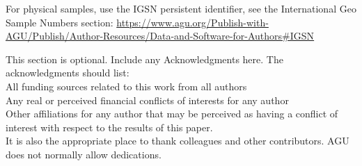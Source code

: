 \documentclass[draft]{agujournal2019}
\begin{document}
For physical samples, use the IGSN persistent identifier, see the International Geo Sample Numbers section:
\url{https://www.agu.org/Publish-with-AGU/Publish/Author-Resources/Data-and-Software-for-Authors#IGSN}

\acknowledgments
This section is optional. Include any Acknowledgments here.
The acknowledgments should list:\\
All funding sources related to this work from all authors\\
Any real or perceived financial conflicts of interests for any author\\
Other affiliations for any author that may be perceived as having a conflict of interest with respect to the results of this paper.\\
It is also the appropriate place to thank colleagues and other contributors. AGU does not normally allow dedications.



%
%



%
{}


%
%
%
%
%
\end{document}
